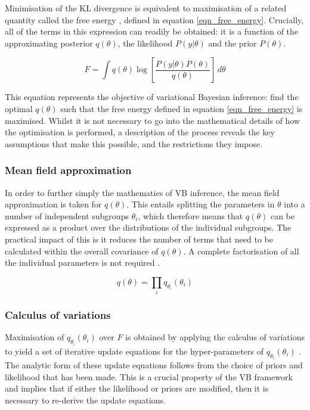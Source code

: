 \documentclass[12pt]{report}
\begin{document}
Minimisation of the KL divergence is equivalent to maximisation of a related quantity called the free energy \cite{Chappell2009}, defined in equation \ref{eqn_free_energy}. Crucially, all of the terms in this expression can readily be obtained: it is a function of the approximating posterior $q(\theta)$, the likelihood $P(y|\theta)$ and the prior $P(\theta)$. 

\begin{equation} 
F = \int q(\theta) \log{ \left[ \frac{ P(y|\theta) P(\theta) }{ q(\theta) } \right] } \, d\theta
\label{eqn_free_energy}
\end{equation}

This equation represents the objective of variational Bayesian inference: find the optimal $q(\theta)$ such that the free energy defined in equation \ref{eqn_free_energy} is maximised. Whilst it is not necessary to go into the mathematical details of how the optimisation is performed, a description of the process reveals the key assumptions that make this possible, and the restrictions they impose. 

\subsubsection{Mean field approximation}

In order to further simply the mathematics of VB inference, the mean field approximation is taken for $q(\theta)$. This entails splitting the parameters in $\theta$ into a number of independent subgroups $\theta_i$, which therefore means that $q(\theta)$ can be expressed as a product over the distributions of the individual subgroups. The practical impact of this is it reduces the number of terms that need to be calculated within the overall covariance of $q(\theta)$. A complete factorisation of all the individual parameters is not required \cite{Attias2000}. 

\begin{equation}
q(\theta) = \prod_i q_{\theta_i}(\theta_i)
\end{equation}

\subsubsection{Calculus of variations}

Maximisation of $q_{\theta_i}(\theta_i)$ over $F$ is obtained by applying the calculus of variations to yield a set of iterative update equations for the hyper-parameters of $q_{\theta_i}(\theta_i)$ \cite{Chappell2009}. The analytic form of these update equations follows from the choice of priors and likelihood that has been made. This is a crucial property of the VB framework and implies that if either the likelihood or priors are modified, then it is necessary to re-derive the update equations. 
\end{document}
